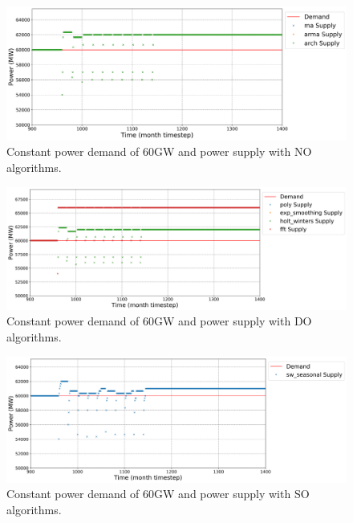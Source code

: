 \documentclass[11pt]{article}
\begin{document}
\begin{figure}[H]
	\centering
	\includegraphics[width=\textwidth]{23-figures/23-power0-buffer01.png} 
	\hfill
	\caption{Constant power demand of 60GW and power supply with NO algorithms.}
	\label{fig:23-NO}
\end{figure}

\begin{figure}[H]
	\centering
	\includegraphics[width=\textwidth]{23-figures/23-power0-buffer02.png} 
	\hfill
	\caption{Constant power demand of 60GW and power supply with DO algorithms.}
	\label{fig:23-DO}
\end{figure}

\begin{figure}[H]
	\centering
	\includegraphics[width=\textwidth]{23-figures/23-power0-buffer03.png} 
	\hfill
	\caption{Constant power demand of 60GW and power supply with SO algorithms.}
	\label{fig:23-SO}
\end{figure}
\end{document}
